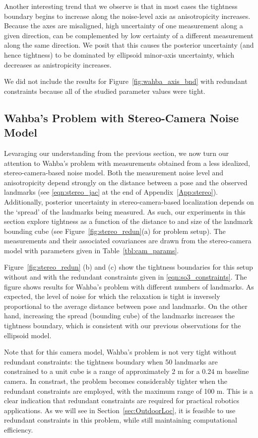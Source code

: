 \documentclass[lettersize,journal]{IEEEtran}
\begin{document}
Another interesting trend that we observe is that in most cases the tightness boundary begins to increase along the noise-level axis as anisotropicity increases. Because the axes are misaligned, high uncertainty of one measurement along a given direction, can be complemented by low certainty of a different measurement along the same direction. We posit that this causes the posterior uncertainty (and hence tightness) to be dominated by ellipsoid minor-axis uncertainty, which decreases as anistropicity increases. 

We did not include the results for Figure~\ref{fig:wahba_axis_bnd} with redundant constraints because all of the studied parameter values were tight. 


\subsection{Wahba's Problem with Stereo-Camera Noise Model}\label{sec:SimWahbaStereo}

Levaraging our understanding from the previous section, we now turn our attention to Wahba's problem with measurements obtained from a less idealized, stereo-camera-based noise model. Both the measurement noise level and anisotropicity depend strongly on the distance between a pose and the observed landmarks (see \eqref{eqn:stereo_jac} at the end of Appendix~\ref{App:stereo}). Additionally, posterior uncertainty in stereo-camera-based localization depends on the `spread' of the landmarks being measured. As such, our experiments in this section explore tightness as a function of the distance to and size of the landmark bounding cube (see Figure~\ref{fig:stereo_redun}(a) for problem setup). The measurements and their associated covariances are drawn from the stereo-camera model with parameters given in Table~\ref{tbl:cam_params}.

Figure~\ref{fig:stereo_redun} (b) and (c) show the tightness boundaries for this setup without and with the redundant constraints given in \eqref{eqn:so3_constraints}. 
The figure shows results for Wahba's problem with different numbers of landmarks. As expected, the level of noise for which the relaxation is tight is inversely proportional to the average distance between pose and landmarks. On the other hand, increasing the spread (bounding cube) of the landmarks increases the tightness boundary, which is consistent with our previous observations for the ellipsoid model. 

Note that for this camera model, Wahba's problem is not very tight without redundant constraints: the tightness boundary when 50 landmarks are constrained to a unit cube is a range of approximately 2 m for a 0.24 m baseline camera. In constrast, the problem becomes considerably tighter when the redundant constraints are employed, with the maximum range of 100 m. This is a clear indication that redundant constraints are required for practical robotics applications. As we will see in Section~\ref{sec:OutdoorLoc}, it is feasible to use redundant constraints in this problem, while still maintaining computational efficiency. 
\end{document}
